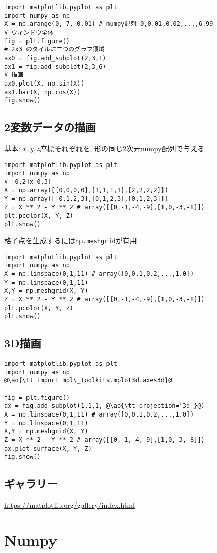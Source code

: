 \documentclass[landscape,7pt,dvipdfmx]{article}
\newcommand{\ao}[1]{{\color{blue}{#1}}}
\begin{document}
\begin{multicols*}{3}
\begin{lstlisting}
import matplotlib.pyplot as plt
import numpy as np 
X = np.arange(0, 7, 0.01) # numpy配列 0,0.01,0.02,...,6.99
# ウィンドウ全体
fig = plt.figure()
# 2x3 のタイルに二つのグラフ領域
ax0 = fig.add_subplot(2,3,1)
ax1 = fig.add_subplot(2,3,6)
# 描画
ax0.plot(X, np.sin(X))
ax1.bar(X, np.cos(X))
fig.show()
\end{lstlisting}

\subsection{2変数データの描画}
基本: $x, y, z$座標それぞれを, 形の同じ2次元numpy配列で与える
\begin{lstlisting}
import matplotlib.pyplot as plt
import numpy as np 
# [0,2]x[0,3]
X = np.array([[0,0,0,0],[1,1,1,1],[2,2,2,2]])
Y = np.array([[0,1,2,3],[0,1,2,3],[0,1,2,3]])
Z = X ** 2 - Y ** 2 # array([[0,-1,-4,-9],[1,0,-3,-8]])
plt.pcolor(X, Y, Z)
plt.show()
\end{lstlisting}
格子点を生成するには{\tt np.meshgrid}が有用
\begin{lstlisting}
import matplotlib.pyplot as plt
import numpy as np 
X = np.linspace(0,1,11) # array([0,0.1,0.2,...,1.0])
Y = np.linspace(0,1,11)
X,Y = np.meshgrid(X, Y)
Z = X ** 2 - Y ** 2 # array([[0,-1,-4,-9],[1,0,-3,-8]])
plt.pcolor(X, Y, Z)
plt.show()
\end{lstlisting}

\subsection{3D描画}
\begin{lstlisting}
import matplotlib.pyplot as plt
import numpy as np 
@\ao{\tt import mpl\_toolkits.mplot3d.axes3d}@

fig = plt.figure()
ax = fig.add_subplot(1,1,1, @\ao{\tt projection='3d'}@)
X = np.linspace(0,1,11) # array([0,0.1,0.2,...,1.0])
Y = np.linspace(0,1,11)
X,Y = np.meshgrid(X, Y)
Z = X ** 2 - Y ** 2 # array([[0,-1,-4,-9],[1,0,-3,-8]])
ax.plot_surface(X, Y, Z)
fig.show()
\end{lstlisting}


\subsection{ギャラリー}
\url{https://matplotlib.org/gallery/index.html}

\section{Numpy}

\end{multicols*}
\end{document}
